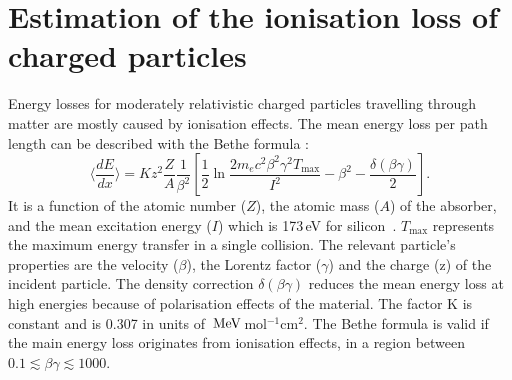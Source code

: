\section{Estimation of the ionisation loss of charged particles}
\label{sec:sub:MeasuringDeDx}
Energy losses for moderately relativistic charged particles travelling through matter are mostly caused by ionisation effects.
The mean energy loss per path length can be described with the Bethe formula \cite{bib:Bethe_1930}:
\begin{equation}
\langle \frac{dE}{dx} \rangle = Kz^2\frac{Z}{A}\frac{1}{\beta^2} [ \frac{1}{2} \ln{\frac{2m_e c^2 \beta^2 \gamma^2 T_{\text{max}}}{I^2}} - \beta^2 - \frac{\delta( \beta \gamma )}{2} ].
\end{equation}
It is a function of the atomic number ($Z$), the atomic mass ($A$) of the absorber, and the mean excitation energy ($I$) which is 173\,eV for silicon~\cite{bib:NIST}.  
$T_{\text{max}}$ represents the maximum energy transfer in a single collision.
The relevant particle's properties are the velocity ($\beta$), the Lorentz factor ($\gamma$) and the charge (z) of the incident particle.
The density correction $\delta( \beta \gamma )$ reduces the mean energy loss at high energies because of polarisation effects of the material. 
The factor K is constant and is 0.307 in units of $\,\text{Me}\kern-0.06667em\text{V}\,$mol$^{-1}$cm$^2$.
The Bethe formula is valid if the main energy loss originates from ionisation effects, \ie in a region between $0.1\lesssim\beta\gamma\lesssim 1000$.


